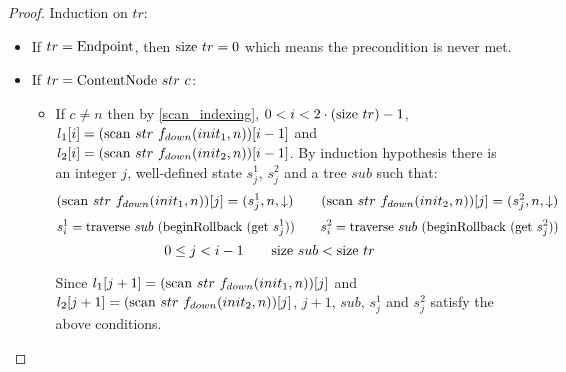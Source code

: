 \documentclass{article}
\newcommand{\textfun}[1]{\textup{#1}}
\newcommand{\fdown}[2]{\ensuremath{f_{down}(#1, #2)}}
\newcommand{\nilNode}{\textfun{Endpoint}}
\newcommand{\contentNode}[2]{\textfun{ContentNode}\ #1\ #2}
\newcommand{\traverse}[2]{\textfun{traverse}\ #1\ #2}
\newcommand{\scan}[2]{\textfun{scan}\ #1\ #2}
\newcommand{\down}{\downarrow}
\newcommand{\beginRb}[1]{\textfun{beginRollback}\ #1}
\newcommand{\get}[1]{\textfun{get}\ #1}
\newcommand{\size}[1]{\textfun{size}\ #1}
\begin{document}
\begin{proof}
    Induction on $tr$:
    \begin{itemize}
        \item If $tr = \nilNode$, then $\size{tr} = 0$ which means the precondition is never met.
        \item If $tr = \contentNode{str}{c}$:
        
        \begin{itemize}
            \item If $c \neq n$ then by \cref{scan_indexing}, $ 0 < i < 2 \cdot (\size{tr}) - 1$, $l_1[i] = (\scan{str}{\fdown{init_1}{n}})[i - 1]$ and 
            $l_2[i] = (\scan{str}{\fdown{init_2}{n}})[i - 1]$.
        By induction hypothesis there is an integer $j$, well-defined state $s^1_j$, $s^2_j$ and a tree $sub$ such that:
        \[(\scan{str}{\fdown{init_1}{n}})[j] = (s^1_j, n, \down) \qquad (\scan{str}{\fdown{init_2}{n}})[j] = (s^2_j, n, \down)\]
        \[s^1_i = \traverse{sub}{(\beginRb{(\get{s^1_j})})} \qquad s^2_i = \traverse{sub}{(\beginRb{(\get{s^2_j})})}\]
        \[0 \leq j < i - 1 \qquad \size{sub} < \size{tr} \qquad \]

        Since $l_1[j + 1] = (\scan{str}{\fdown{init_1}{n}})[j]$ and $l_2[j + 1] = (\scan{str}{\fdown{init_2}{n}})[j]$, $j + 1$, $sub$, $s^1_j$ and $s^2_j$ satisfy the above conditions.


\end{itemize}
\end{itemize}
\end{proof}
\end{document}
